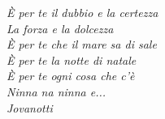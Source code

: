 \vspace{17cm}

\begin{flushright}
\itshape{ \`E per te il dubbio e la certezza \\
	La forza e la dolcezza\\
	\`E per te che il mare sa di sale \\
	\`E per te la notte di natale \\
	\`E per te ogni cosa che c'\`e \\ 
	Ninna na ninna e...\\
	\vspace{0.5cm}
	Jovanotti
	 }
\end{flushright}
